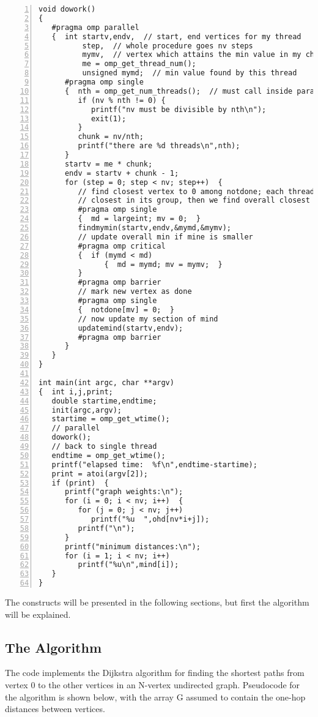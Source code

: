 \begin{Verbatim}[fontsize=\relsize{-2},numbers=left]
void dowork()
{
   #pragma omp parallel
   {  int startv,endv,  // start, end vertices for my thread
          step,  // whole procedure goes nv steps
          mymv,  // vertex which attains the min value in my chunk
          me = omp_get_thread_num();
          unsigned mymd;  // min value found by this thread
      #pragma omp single
      {  nth = omp_get_num_threads();  // must call inside parallel block
         if (nv % nth != 0) {
            printf("nv must be divisible by nth\n");
            exit(1);
         }
         chunk = nv/nth;
         printf("there are %d threads\n",nth);
      }
      startv = me * chunk;
      endv = startv + chunk - 1;
      for (step = 0; step < nv; step++)  {
         // find closest vertex to 0 among notdone; each thread finds
         // closest in its group, then we find overall closest
         #pragma omp single
         {  md = largeint; mv = 0;  }
         findmymin(startv,endv,&mymd,&mymv);
         // update overall min if mine is smaller
         #pragma omp critical
         {  if (mymd < md)
               {  md = mymd; mv = mymv;  }
         }
         #pragma omp barrier
         // mark new vertex as done
         #pragma omp single
         {  notdone[mv] = 0;  }
         // now update my section of mind
         updatemind(startv,endv);
         #pragma omp barrier
      }
   }
}

int main(int argc, char **argv)
{  int i,j,print;
   double startime,endtime;
   init(argc,argv);
   startime = omp_get_wtime();
   // parallel
   dowork();
   // back to single thread
   endtime = omp_get_wtime();
   printf("elapsed time:  %f\n",endtime-startime);
   print = atoi(argv[2]);
   if (print)  {
      printf("graph weights:\n");
      for (i = 0; i < nv; i++)  {
         for (j = 0; j < nv; j++)
            printf("%u  ",ohd[nv*i+j]);
         printf("\n");
      }
      printf("minimum distances:\n");
      for (i = 1; i < nv; i++)
         printf("%u\n",mind[i]);
   }
}
\end{Verbatim}

The constructs will be presented in the following sections, but first
the algorithm will be explained.

\subsection{The Algorithm}

The code implements the Dijkstra algorithm for finding the shortest
paths from vertex 0 to the other vertices in an N-vertex undirected
graph.  Pseudocode for the algorithm is shown below, with the array G
assumed to contain the one-hop distances between vertices.


